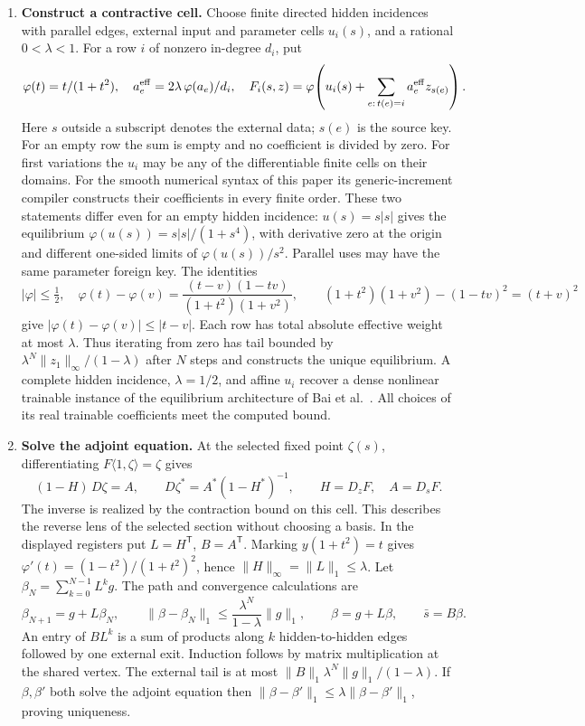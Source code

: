 \documentclass[11pt,a4paper]{article}
\theoremstyle{definition}
\theoremstyle{remark}\newaliascnt{remark}{theorem}
\numberwithin{equation}{section}
\begin{document}
\begin{enumerate}[titledsteps]
    \item \textbf{Construct a contractive cell.} Choose finite directed hidden incidences with parallel edges, external input and parameter cells \(u_i(s)\), and a rational \(0<\lambda<1\). For a row \(i\) of nonzero in-degree \(d_i\), put
\[
 \varphi(t)=t/(1+t^2),\quad
 a_e^{\rm eff}=2\lambda\,\varphi(a_e)/d_i,\quad
 F_i(s,z)=\varphi\!\left(u_i(s)+\sum_{e:\,t(e)=i}a_e^{\rm eff}z_{s(e)}\right).
\]
Here $s$ outside a subscript denotes the external data; $s(e)$ is the source key. For an empty row the sum is empty and no coefficient is divided by zero. For first variations the $u_i$ may be any of the differentiable finite cells on their domains. For the smooth numerical syntax of this paper its generic-increment compiler constructs their coefficients in every finite order. These two statements differ even for an empty hidden incidence: $u(s)=s|s|$ gives the equilibrium $\varphi(u(s))=s|s|/(1+s^4)$, with derivative zero at the origin and different one-sided limits of $\varphi(u(s))/s^2$. Parallel uses may have the same parameter foreign key. The identities
\[
 |\varphi|\le\tfrac12,\quad
 \varphi(t)-\varphi(v)=\frac{(t-v)(1-tv)}{(1+t^2)(1+v^2)},\qquad
 (1+t^2)(1+v^2)-(1-tv)^2=(t+v)^2
\]
give $|\varphi(t)-\varphi(v)|\le |t-v|$. Each row has total absolute effective weight at most $\lambda$. Thus iterating from zero has tail bounded by $\lambda^N\|z_1\|_\infty/(1-\lambda)$ after $N$ steps and constructs the unique equilibrium. A complete hidden incidence, $\lambda=1/2$, and affine $u_i$ recover a dense nonlinear trainable instance of the equilibrium architecture of Bai et al.~\cite{deq}. All choices of its real trainable coefficients meet the computed bound.


    \item \textbf{Solve the adjoint equation.} At the selected fixed point \(\zeta(s)\), differentiating \(F\langle1,\zeta\rangle=\zeta\) gives
\[
 (1-H)\,D\zeta=A,\qquad
 D\zeta^*=A^*(1-H^*)^{-1},
 \qquad H=D_zF,\quad A=D_sF .
\]
The inverse is realized by the contraction bound on this cell. This describes the reverse lens of the selected section without choosing a basis. In the displayed registers put \(L=H^{\mathsf T}\), \(B=A^{\mathsf T}\). Marking \(y(1+t^2)=t\) gives \(\varphi'(t)=(1-t^2)/(1+t^2)^2\), hence \(\|H\|_\infty=\|L\|_1\le\lambda\). Let \(\beta_N=\sum_{k=0}^{N-1}L^k g\). The path and convergence calculations are
\[
 \beta_{N+1}=g+L\beta_N,\qquad
 \|\beta-\beta_N\|_1\le\frac{\lambda^N}{1-\lambda}\|g\|_1,\qquad
 \beta=g+L\beta,\qquad \bar s=B\beta .
\]
An entry of \(BL^k\) is a sum of products along \(k\) hidden-to-hidden edges followed by one external exit. Induction follows by matrix multiplication at the shared vertex. The external tail is at most \(\|B\|_1\lambda^N\|g\|_1/(1-\lambda)\). If \(\beta,\beta'\) both solve the adjoint equation then \(\|\beta-\beta'\|_1\le\lambda\|\beta-\beta'\|_1\), proving uniqueness.



\end{enumerate}
\end{document}
